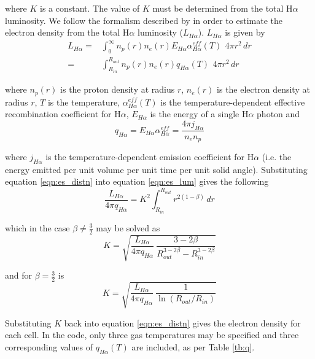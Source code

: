         \noindent  where $K$ is a constant.  The value of $K$ must be determined from the total H$\alpha$ luminosity.  We follow the formalism described by \citet{Osterbrock2006} in order to estimate the electron density from the total H$\alpha$ luminosity ($L_{H\alpha}$). $L_{H\alpha}$ is given by
        \begin{align}
        L_{H\alpha} =& \int _0 ^{\infty} n_p(r) n_e(r) E_{H\alpha} \alpha^{eff}_{H\alpha}(T) ~ \, 4 \pi r^2 \, dr  \\
        =& \int _{R_{in}} ^{R_{out}} n_p(r) n_e(r) q_{H\alpha}(T) ~ \, 4 \pi r^2 \, dr \label{eqn:es_lum}
        \end{align}

        \noindent where $n_p(r)$ is the proton density at radius $r$, $n_e(r)$ is the electron density at radius $r$, $T$ is the temperature, $\alpha^{eff}_{H\alpha}(T)$ is the temperature-dependent effective recombination coefficient for H$\alpha$, $E_{H\alpha}$ is the energy of a single H$\alpha$ photon and 
        \begin{equation}
        q_{H\alpha}=E_{H\alpha} \alpha^{eff}_{H\alpha}=\frac{4 \pi j_{H\alpha}}{n_e n_p}
        \end{equation}

        \noindent where $j_{H\alpha}$ is the temperature-dependent emission coefficient for H$\alpha$ (i.e. the energy emitted per unit volume per unit time per unit solid angle).  Substituting equation \ref{eqn:es_distn} into equation \ref{eqn:es_lum} gives the following
        \begin{equation}
        \frac{L_{H\alpha}}{4 \pi q_{H\alpha}} = K^2 \int _{R_{in}} ^{R_{out}} r^{2(1-\beta)} \, dr
        \end{equation}

        which in the case $\beta \ne \frac{3}{2}$ may be solved as 
        \begin{equation}
        \label{eqn:kcalc1}
        K= \sqrt{\frac{L_{H\alpha}}{4 \pi q_{H\alpha}} ~\frac{3-2\beta}{R_{out}^{3-2\beta}-R_{in}^{3-2\beta}}}
        \end{equation}

        and for $\beta=\frac{3}{2}$ is
        \begin{equation}
        \label{eqn:kcalc2}
        K= \sqrt{\frac{L_{H\alpha}}{4 \pi q_{H\alpha}} ~\frac{1}{\ln({R_{out}/R_{in}})}}
        \end{equation}

        Substituting $K$ back into equation \ref{eqn:es_distn} gives the electron density for each cell.  In the code, only three gas temperatures may be specified and three corresponding values of $q_{H\alpha}(T)$ are included, as per Table \ref{tb:q}.


